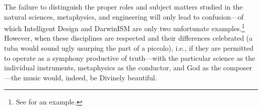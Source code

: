 The failure to distinguish the proper roles and subject matters studied in the natural sciences, metaphysics, and engineering will only lead to confusion---of which Intelligent Design and DarwinISM are only two unfortunate examples.\footnote{See \citet[][p.~372]{sigcell} for an example.} However, when these disciplines are respected and their differences celebrated (a tuba would sound ugly usurping the part of a piccolo), i.e., if they are permitted to operate as a symphony productive of truth---with the particular science as the individual instruments, metaphysics as the conductor, and God as the composer---the music would, indeed, be Divinely beautiful.

